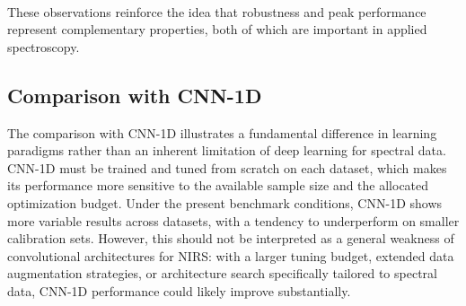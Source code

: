 \documentclass{article}
\begin{document}
~

These observations reinforce the idea that robustness and peak performance represent complementary properties, both of which are important in applied spectroscopy.

\subsection{Comparison with CNN-1D}

The comparison with CNN-1D illustrates a fundamental difference in learning paradigms rather than an inherent limitation of deep learning for spectral data. CNN-1D must be trained and tuned from scratch on each dataset, which makes its performance more sensitive to the available sample size and the allocated optimization budget. Under the present benchmark conditions, CNN-1D shows more variable results across datasets, with a tendency to underperform on smaller calibration sets. However, this should not be interpreted as a general weakness of convolutional architectures for NIRS: with a larger tuning budget, extended data augmentation strategies, or architecture search specifically tailored to spectral data, CNN-1D performance could likely improve substantially.
\end{document}
